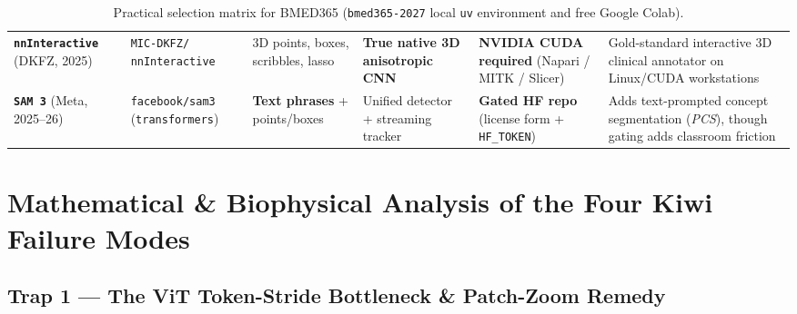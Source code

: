 \documentclass[10.5pt,a4paper]{article}
\begin{document}
\begin{table}[H]
\begin{tabularx}{\textwidth}{L{2.0cm} L{2.7cm} L{2.3cm} L{2.3cm} L{2.6cm} Y}
\textbf{\texttt{nnInteractive}} \newline (DKFZ, 2025) & \texttt{MIC-DKFZ/} \texttt{nnInteractive} & 3D points, boxes, scribbles, lasso & \textbf{True native 3D anisotropic CNN} & \textbf{NVIDIA CUDA required} (Napari / MITK / Slicer) & Gold-standard interactive 3D clinical annotator on Linux/CUDA workstations \\
\textbf{\texttt{SAM 3}} \newline (Meta, 2025--26) & \texttt{facebook/sam3} \newline (\texttt{transformers}) & \textbf{Text phrases} + points/boxes & Unified detector + streaming tracker & \textbf{Gated HF repo} (license form + \texttt{HF\_TOKEN}) & Adds text-prompted concept segmentation (\emph{PCS}), though gating adds classroom friction \\
\bottomrule
\end{tabularx}
\caption{Practical selection matrix for BMED365 (\texttt{bmed365-2027} local \texttt{uv} environment and free Google Colab).}
\end{table}

\section{Mathematical \& Biophysical Analysis of the Four Kiwi Failure Modes}

\subsection{Trap 1 --- The ViT Token-Stride Bottleneck \& Patch-Zoom Remedy}
\label{sec:trap1}
\end{document}
